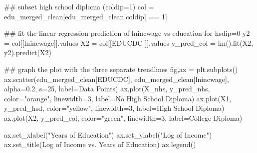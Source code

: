 \documentclass[
  letterpaper,
  DIV=11,
  numbers=noendperiod]{scrartcl}
\newenvironment{Shaded}{\begin{snugshade}}{\end{snugshade}}
\newcommand{\CommentTok}[1]{\textcolor[rgb]{0.37,0.37,0.37}{#1}}
\newcommand{\DecValTok}[1]{\textcolor[rgb]{0.68,0.00,0.00}{#1}}
\newcommand{\FloatTok}[1]{\textcolor[rgb]{0.68,0.00,0.00}{#1}}
\newcommand{\NormalTok}[1]{\textcolor[rgb]{0.00,0.23,0.31}{#1}}
\newcommand{\OperatorTok}[1]{\textcolor[rgb]{0.37,0.37,0.37}{#1}}
\newcommand{\StringTok}[1]{\textcolor[rgb]{0.13,0.47,0.30}{#1}}
\begin{document}
\begin{Shaded}
\begin{Highlighting}[]
\CommentTok{\#\# subset high school diploma (coldip=1)}
\NormalTok{col }\OperatorTok{=}\NormalTok{ edu\_merged\_clean[edu\_merged\_clean[}\StringTok{\textquotesingle{}coldip\textquotesingle{}}\NormalTok{] }\OperatorTok{==} \DecValTok{1}\NormalTok{]}

\CommentTok{\#\# fit the linear regression prediction of lnincwage vs education for hsdip=0}
\NormalTok{y2 }\OperatorTok{=}\NormalTok{ col[[}\StringTok{\textquotesingle{}lnincwage\textquotesingle{}}\NormalTok{]].values}
\NormalTok{X2 }\OperatorTok{=}\NormalTok{ col[[}\StringTok{\textquotesingle{}EDUCDC\textquotesingle{}}\NormalTok{ ]].values}
\NormalTok{y\_pred\_col }\OperatorTok{=}\NormalTok{ lm().fit(X2, y2).predict(X2)}
\end{Highlighting}
\end{Shaded}

\begin{Shaded}
\begin{Highlighting}[]
\CommentTok{\#\# graph the plot with the three separate trendlines }
\NormalTok{fig,ax }\OperatorTok{=}\NormalTok{ plt.subplots()}
\NormalTok{ax.scatter(edu\_merged\_clean[}\StringTok{\textquotesingle{}EDUCDC\textquotesingle{}}\NormalTok{], edu\_merged\_clean[}\StringTok{\textquotesingle{}lnincwage\textquotesingle{}}\NormalTok{], alpha}\OperatorTok{=}\FloatTok{0.2}\NormalTok{, s}\OperatorTok{=}\DecValTok{25}\NormalTok{, label}\OperatorTok{=}\StringTok{\textquotesingle{}Data Points\textquotesingle{}}\NormalTok{)}
\NormalTok{ax.plot(X\_nhs, y\_pred\_nhs, color}\OperatorTok{=}\StringTok{"orange"}\NormalTok{, linewidth}\OperatorTok{=}\DecValTok{3}\NormalTok{, label}\OperatorTok{=}\StringTok{\textquotesingle{}No High School Diploma\textquotesingle{}}\NormalTok{)}
\NormalTok{ax.plot(X1, y\_pred\_hsd, color}\OperatorTok{=}\StringTok{"yellow"}\NormalTok{, linewidth}\OperatorTok{=}\DecValTok{3}\NormalTok{, label}\OperatorTok{=}\StringTok{\textquotesingle{}High School Diploma\textquotesingle{}}\NormalTok{)}
\NormalTok{ax.plot(X2, y\_pred\_col, color}\OperatorTok{=}\StringTok{"green"}\NormalTok{, linewidth}\OperatorTok{=}\DecValTok{3}\NormalTok{, label}\OperatorTok{=}\StringTok{\textquotesingle{}College Diploma\textquotesingle{}}\NormalTok{)}

\NormalTok{ax.set\_xlabel(}\StringTok{"Years of Education"}\NormalTok{)}
\NormalTok{ax.set\_ylabel(}\StringTok{"Log of Income"}\NormalTok{)}
\NormalTok{ax.set\_title(}\StringTok{\textquotesingle{}Log of Income vs. Years of Education\textquotesingle{}}\NormalTok{)}
\NormalTok{ax.legend()}
\end{Highlighting}
\end{Shaded}
\end{document}
